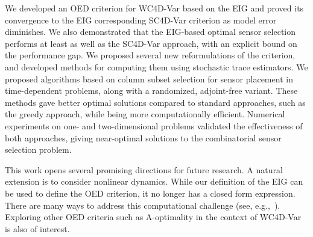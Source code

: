 \documentclass{aims} %
\theoremstyle{definition}
\begin{document}
We developed an OED criterion for WC4D-Var based on the EIG and proved its convergence to the EIG corresponding SC4D-Var criterion as model error diminishes. We also demonstrated that the EIG-based optimal sensor selection performs at least as well as the SC4D-Var approach, with an explicit bound on the performance gap. We proposed several new reformulations of the criterion, and developed methods for computing them using stochastic trace estimators. 
We proposed algorithms based on column subset selection for sensor placement in time-dependent problems, along with a randomized, adjoint-free variant. 
These methods gave better optimal solutions compared to standard approaches, such as the greedy approach, while being more computationally efficient. Numerical experiments on one- and two-dimensional problems validated the effectiveness of both approaches, giving near-optimal solutions to the combinatorial sensor selection problem.

This work opens several promising directions for future research. A natural extension is to consider nonlinear dynamics. While our definition of the EIG can be used to define the OED criterion, it no longer has a closed form expression. There are many ways to address this computational challenge (see, e.g.,~\cite{Huan_Jagalur_Marzouk_2024}). Exploring other OED criteria such as A-optimality in the context of WC4D-Var is also of interest. 









\end{document}
